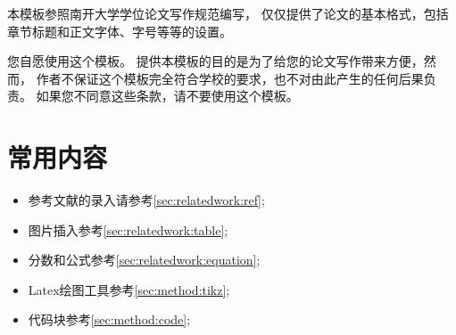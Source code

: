 本模板参照南开大学学位论文写作规范编写，
仅仅提供了论文的基本格式，包括章节标题和正文字体、字号等等的设置。



您自愿使用这个模板。
提供本模板的目的是为了给您的论文写作带来方便，然而，
作者不保证这个模板完全符合学校的要求，也不对由此产生的任何后果负责。
如果您不同意这些条款，请不要使用这个模板。


\section{常用内容}

\begin{itemize}
	\item 参考文献的录入请参考\ref{sec:relatedwork:ref};
	\item 图片插入参考\ref{sec:relatedwork:table};
	\item 分数和公式参考\ref{sec:relatedwork:equation};
	\item Latex绘图工具参考\ref{sec:method:tikz};
	\item 代码块参考\ref{sec:method:code};
\end{itemize}